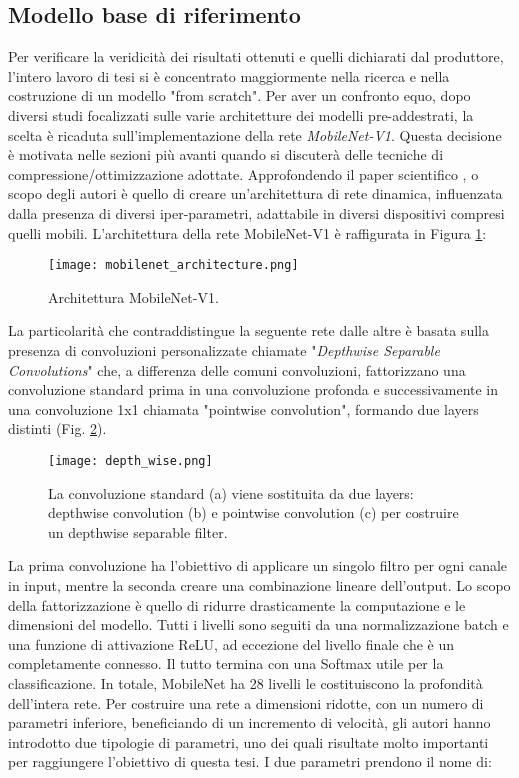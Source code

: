 \subsection{Modello base di riferimento}\label{MBNET}
Per verificare la veridicità dei risultati ottenuti e quelli dichiarati dal produttore, l'intero lavoro di tesi si è concentrato maggiormente nella ricerca e nella costruzione di un modello "from scratch". Per aver un confronto equo, dopo diversi studi focalizzati sulle varie architetture dei modelli pre-addestrati, la scelta è ricaduta sull'implementazione della rete \emph{MobileNet-V1}. Questa decisione è motivata nelle sezioni più avanti quando si discuterà delle tecniche di compressione/ottimizzazione adottate. 
Approfondendo il paper scientifico \cite{howard2017mobilenets}, o scopo degli autori è quello di creare un'architettura di rete dinamica, influenzata dalla presenza di diversi iper-parametri, adattabile in diversi dispositivi compresi quelli mobili. L'architettura della rete MobileNet-V1 è raffigurata in Figura \ref{mobilenetV1}:
\begin{figure}
    \centering
    \texttt{[image: mobilenet\_architecture.png]}
    \centering
    \caption{Architettura MobileNet-V1.}
    \label{mobilenetV1}
\end{figure}
La particolarità che contraddistingue la seguente rete dalle altre è basata sulla presenza di convoluzioni personalizzate chiamate "\emph{Depthwise Separable Convolutions}"  che, a differenza delle comuni convoluzioni, fattorizzano una convoluzione standard prima in una convoluzione profonda e successivamente in una convoluzione 1x1 chiamata "pointwise convolution", formando due layers distinti (Fig. \ref{depth_wise}).
\begin{figure}
    \centering
    \texttt{[image: depth\_wise.png]}
    \centering
    \caption{La convoluzione standard (a) viene sostituita da due layers: depthwise convolution (b) e pointwise convolution (c) per costruire un depthwise separable filter.}
    \label{depth_wise}
\end{figure}
La prima convoluzione ha l'obiettivo di applicare un singolo filtro per ogni canale in input, mentre la seconda creare una combinazione lineare dell'output. Lo scopo della fattorizzazione è quello di ridurre drasticamente la computazione e le dimensioni del modello. Tutti i livelli sono seguiti da una normalizzazione batch e una funzione di attivazione ReLU, ad eccezione del livello finale che è un completamente connesso. Il tutto termina con una Softmax utile per la classificazione. In totale, MobileNet ha 28 livelli le costituiscono la profondità dell'intera rete. Per costruire una rete a dimensioni ridotte, con un numero di parametri inferiore, beneficiando di un incremento di velocità, gli autori hanno introdotto due tipologie di parametri, uno dei quali risultate molto importanti per raggiungere l'obiettivo di questa tesi. I  due parametri prendono il nome di: 
